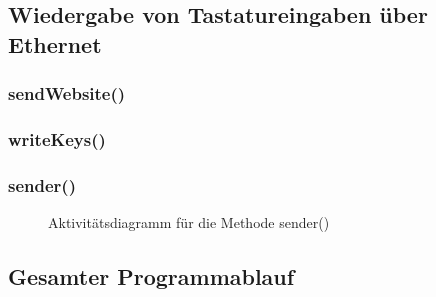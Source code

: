 \subsection{Wiedergabe von Tastatureingaben über Ethernet}
\subsubsection{sendWebsite()}
\subsubsection{writeKeys()}
\subsubsection{sender()}
\begin{figure}
  \centering
  \caption{Aktivitätsdiagramm für die Methode sender()}
  \label{diagram_sender}
\end{figure}

\subsection{Gesamter Programmablauf}



